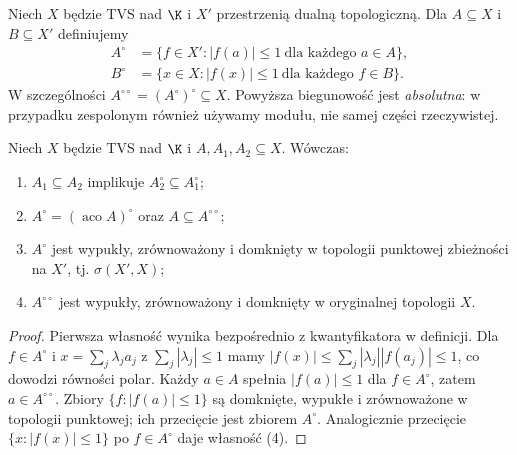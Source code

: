 \begin{definicja}\label{def:polar}
Niech $X$ będzie TVS nad $\K$ i $X'$ przestrzenią dualną topologiczną.
Dla $A\subseteq X$ i $B\subseteq X'$ definiujemy
\[
 \begin{aligned}
 A^\circ&=\{f\in X':|f(a)|\le1\ \text{dla każdego }a\in A\},\\
 B^\circ&=\{x\in X:|f(x)|\le1\ \text{dla każdego }f\in B\}.
 \end{aligned}
\]
W szczególności $A^{\circ\circ}=(A^\circ)^\circ\subseteq X$.
Powyższa biegunowość jest \emph{absolutna}: w przypadku
zespolonym również używamy modułu, nie samej części rzeczywistej.
\end{definicja}

\begin{stwierdzenie}\label{prop:polar-properties}
Niech $X$ będzie TVS nad $\K$ i $A,A_1,A_2\subseteq X$.
Wówczas:
\begin{enumerate}
\item $A_1\subseteq A_2$ implikuje $A_2^\circ\subseteq A_1^\circ$;
\item $A^\circ=(\operatorname{aco}A)^\circ$ oraz
      $A\subseteq A^{\circ\circ}$;
\item $A^\circ$ jest wypukły, zrównoważony i domknięty
      w topologii punktowej zbieżności na $X'$, tj. $\sigma(X',X)$;
\item $A^{\circ\circ}$ jest wypukły, zrównoważony i domknięty
      w oryginalnej topologii $X$.
\end{enumerate}
\end{stwierdzenie}
\begin{proof}
Pierwsza własność wynika bezpośrednio z kwantyfikatora
w definicji. Dla $f\in A^\circ$ i
$x=\sum_j\lambda_j a_j$ z $\sum_j|\lambda_j|\le1$
mamy $|f(x)|\le\sum_j|\lambda_j||f(a_j)|\le1$,
co dowodzi równości polar. Każdy $a\in A$ spełnia
$|f(a)|\le1$ dla $f\in A^\circ$, zatem $a\in A^{\circ\circ}$.
Zbiory $\{f:|f(a)|\le1\}$ są domknięte, wypukłe i
zrównoważone w topologii punktowej; ich przecięcie
jest zbiorem $A^\circ$. Analogicznie przecięcie
$\{x:|f(x)|\le1\}$ po $f\in A^\circ$ daje własność (4).
\end{proof}

